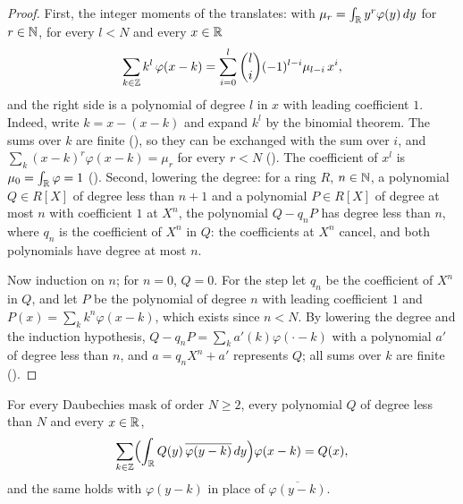 \begin{proof}
\leanok
{}
First, the integer moments of the translates: with $\mu_r = \int_{\mathbb{R}} y^r \varphi(y) \, dy$ for
$r \in \mathbb{N}$, for every $l < N$ and every $x \in \mathbb{R}$
\[
  \sum_{k \in \mathbb{Z}} k^l \, \varphi(x - k)
  = \sum_{i=0}^{l} \binom{l}{i} (-1)^{l-i} \mu_{l-i} \, x^i ,
\]
and the right side is a polynomial of degree $l$ in $x$ with leading coefficient $1$. Indeed,
write $k = x - (x - k)$ and expand $k^l$ by the binomial theorem. The sums over $k$ are finite
(), so they can be exchanged with the sum over $i$, and
$\sum_k (x - k)^r \varphi(x - k) = \mu_r$ for every $r < N$
(). The coefficient of $x^l$ is $\mu_0 = \int_{\mathbb{R}} \varphi = 1$
(). Second, lowering the degree: for a ring $R$, $n \in \mathbb{N}$, a
polynomial $Q \in R[X]$ of degree less than $n + 1$ and a polynomial $P \in R[X]$ of degree at
most $n$ with coefficient $1$ at $X^n$, the polynomial $Q - q_n P$ has degree less than $n$,
where $q_n$ is the coefficient of $X^n$ in $Q$: the coefficients at $X^n$ cancel, and both
polynomials have degree at most $n$.

Now induction on $n$; for $n = 0$, $Q = 0$. For the step let $q_n$ be the coefficient of $X^n$
in $Q$, and let $P$ be the polynomial of degree $n$ with leading coefficient $1$ and
$P(x) = \sum_k k^n \varphi(x - k)$, which exists since $n < N$. By lowering the degree and the
induction hypothesis, $Q - q_n P = \sum_k a'(k) \varphi(\cdot - k)$ with a polynomial $a'$ of
degree less than $n$, and $a = q_n X^n + a'$ represents $Q$; all sums over $k$ are finite
().
\end{proof}

\begin{theorem}
\label{thm:daub-poly-reproduction}
\leanok
{}
For every Daubechies mask of order $N \geq 2$, every polynomial $Q$ of degree less than $N$ and
every $x \in \mathbb{R}$,
\[
  \sum_{k \in \mathbb{Z}} \Bigl(\int_{\mathbb{R}} Q(y) \, \overline{\varphi(y - k)} \, dy\Bigr) \varphi(x - k)
  = Q(x) ,
\]
and the same holds with $\varphi(y - k)$ in place of $\overline{\varphi(y - k)}$.
\end{theorem}

